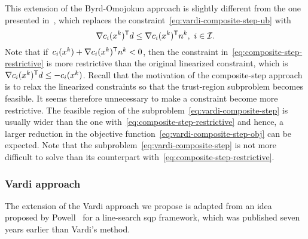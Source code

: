 This extension of the Byrd-Omojokun approach is slightly different from the one presented in~\cite[\S~15.4.4]{Conn_Gould_Toint_2000}, which replaces the constraint~\cref{eq:vardi-composite-step-ub} with
\begin{equation}
    \label{eq:composite-step-restrictive}
    \nabla \con{i}(\iter[k])^{\T} \step \le \nabla \con{i}(\iter[k])^{\T} \nstep[k], ~ i \in \iub.
\end{equation}
Note that if~$\con{i}(\iter[k]) + \nabla \con{i}(\iter[k])^{\T} \nstep[k] < 0$, then the constraint in~\cref{eq:composite-step-restrictive} is more restrictive than the original linearized constraint, which is~$\nabla \con{i}(\iter[k])^{\T} \step \le -\con{i}(\iter[k])$.
Recall that the motivation of the composite-step approach is to relax the linearized constraints so that the trust-region subproblem becomes feasible.
It seems therefore unnecessary to make a constraint become more restrictive.
The feasible region of the subproblem~\cref{eq:vardi-composite-step} is usually wider than the one with~\cref{eq:composite-step-restrictive} and hence, a larger reduction in the objective function~\cref{eq:vardi-composite-step-obj} can be expected.
Note that the subproblem~\cref{eq:vardi-composite-step} is not more difficult to solve than its counterpart with~\cref{eq:composite-step-restrictive}.

\subsubsection{Vardi approach}

The extension of the Vardi approach we propose is adapted from an idea proposed by Powell~\cite[Eqs.~(2.7) and~(2.8)]{Powell_1978a} for a line-search \gls{sqp} framework, which was published seven years earlier than Vardi's method.


